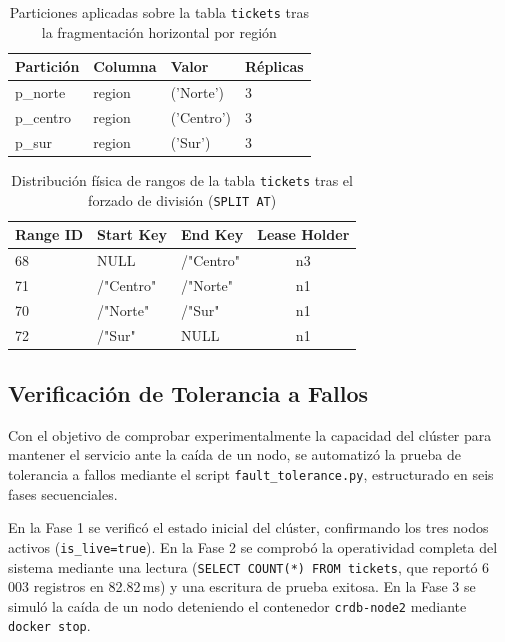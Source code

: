 \documentclass[12pt, a4paper]{article}
\begin{document}
\begin{table}[H]
\centering
\caption{Particiones aplicadas sobre la tabla \texttt{tickets} tras la fragmentación horizontal por región}
\label{tab:particiones}
\begin{tabular}{@{}llll@{}}
\toprule
\textbf{Partición} & \textbf{Columna} & \textbf{Valor} & \textbf{Réplicas} \\
\midrule
p\_norte  & region & ('Norte')  & 3 \\
p\_centro & region & ('Centro') & 3 \\
p\_sur    & region & ('Sur')    & 3 \\
\bottomrule
\end{tabular}
\end{table}

\begin{table}[H]
\centering
\caption{Distribución física de rangos de la tabla \texttt{tickets} tras el forzado de división (\texttt{SPLIT AT})}
\label{tab:rangos}
\begin{tabular}{@{}lllc@{}}
\toprule
\textbf{Range ID} & \textbf{Start Key} & \textbf{End Key} & \textbf{Lease Holder} \\
\midrule
68 & NULL      & /"Centro" & n3 \\
71 & /"Centro" & /"Norte"  & n1 \\
70 & /"Norte"  & /"Sur"    & n1 \\
72 & /"Sur"    & NULL      & n1 \\
\bottomrule
\end{tabular}
\end{table}

\subsection{Verificación de Tolerancia a Fallos}

Con el objetivo de comprobar experimentalmente la capacidad del clúster para mantener el servicio ante la caída de un nodo, se automatizó la prueba de tolerancia a fallos mediante el script \texttt{fault\_tolerance.py}, estructurado en seis fases secuenciales.

En la Fase 1 se verificó el estado inicial del clúster, confirmando los tres nodos activos (\texttt{is\_live=true}). En la Fase 2 se comprobó la operatividad completa del sistema mediante una lectura (\texttt{SELECT COUNT(*) FROM tickets}, que reportó 6\,003 registros en 82.82\,ms) y una escritura de prueba exitosa. En la Fase 3 se simuló la caída de un nodo deteniendo el contenedor \texttt{crdb-node2} mediante \texttt{docker stop}.
\end{document}
